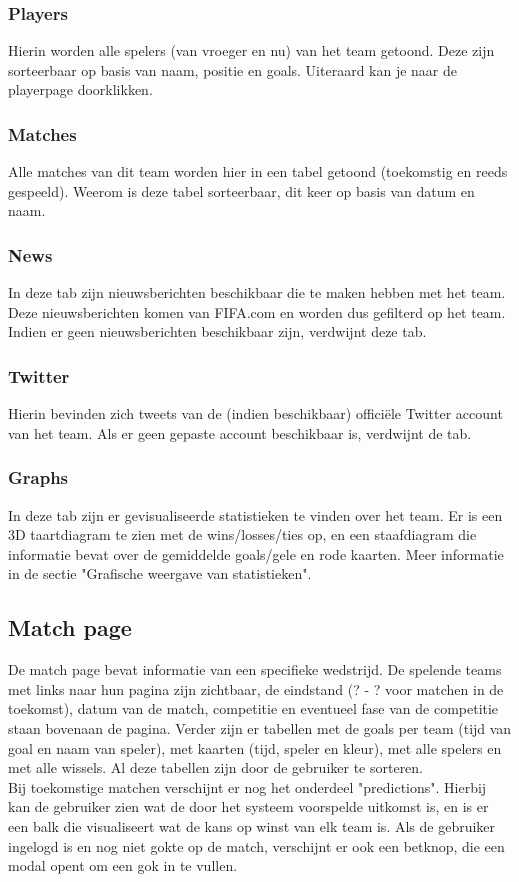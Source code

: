 \documentclass[11pt, a4paper]{article}
\begin{document}
\subsubsection{Players}
Hierin worden alle spelers (van vroeger en nu) van het team getoond. Deze zijn sorteerbaar op basis van naam, positie en goals. Uiteraard kan je naar de playerpage doorklikken.
\subsubsection{Matches}
Alle matches van dit team worden hier in een tabel getoond (toekomstig en reeds gespeeld). Weerom is deze tabel sorteerbaar, dit keer op basis van datum en naam.
\subsubsection{News}
In deze tab zijn nieuwsberichten beschikbaar die te maken hebben met het team. Deze nieuwsberichten komen van FIFA.com en worden dus gefilterd op het team. Indien er geen nieuwsberichten beschikbaar zijn, verdwijnt deze tab.
\subsubsection{Twitter}
Hierin bevinden zich tweets van de (indien beschikbaar) offici\"ele Twitter account van het team. Als er geen gepaste account beschikbaar is, verdwijnt de tab.
\subsubsection{Graphs}
In deze tab zijn er gevisualiseerde statistieken te vinden over het team. Er is een 3D taartdiagram te zien met de wins/losses/ties op, en een staafdiagram die informatie bevat over de gemiddelde goals/gele en rode kaarten. Meer informatie in de sectie "Grafische weergave van statistieken".

\subsection{Match page}
De match page bevat informatie van een specifieke wedstrijd. De spelende teams met links naar hun pagina zijn zichtbaar, de eindstand (? - ? voor matchen in de toekomst), datum van de match, competitie en eventueel fase van de competitie staan bovenaan de pagina. Verder zijn er tabellen met de goals per team (tijd van goal en naam van speler), met kaarten (tijd, speler en kleur), met alle spelers en met alle wissels. Al deze tabellen zijn door de gebruiker te sorteren. \\ Bij toekomstige matchen verschijnt er nog het onderdeel "predictions". Hierbij kan de gebruiker zien wat de door het systeem voorspelde uitkomst is, en is er een balk die visualiseert wat de kans op winst van elk team is. Als de gebruiker ingelogd is en nog niet gokte op de match, verschijnt er ook een betknop, die een modal opent om een gok in te vullen.
\end{document}
